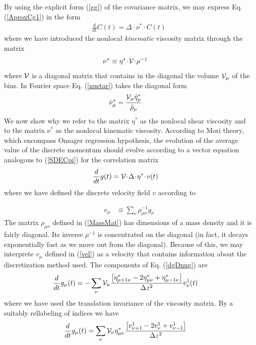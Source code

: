 \documentclass[b5paper,openright,11pt]{book}
\newcommand{\esc}{\!\cdot\!}
\begin{document}
By using the explicit form (\ref{gg}) of the covariance matrix, we may
express Eq. (\ref{AproxCg1}) in the form
\begin{align}
\frac{d}{dt}C(t)= \Delta\esc \nu^*\esc C(t)
\label{SDECpi}
\end{align}
where we  have introduced  the nonlocal  \textit{kinematic} viscosity
matrix through the matrix
\begin{align}
\nu^*&\equiv  \eta^*\esc{\cal V}\esc \rho^{-1}
\label{nustar}
\end{align}
where ${\cal  V}$ is a diagonal  matrix that contains in  the diagonal
the volume ${\cal  V}_\mu$ of the bins.   In Fourier space Eq. (\ref{nustar})
takes the diagonal form
\begin{align}
  \tilde{\nu}_\mu^*&=  \frac{{\cal V}_\mu \tilde{\eta}_\mu^*}{\tilde{\rho}_\mu}
\end{align}
We now show why we refer to the matrix $\eta^*$ as the nonlocal shear
viscosity  and  to  the  matrix $\nu^*$  as  the  nonlocal  kinematic
viscosity.   According   to  Mori  theory,  which   encompass  Onsager
regression  hypothesis, the  evolution  of the  average  value of  the
discrete momentum should evolve according to a vector equation analogous to
(\ref{SDECpi}) for the correlation matrix
\begin{align}
  \frac{d}{dt}g(t)&={\cal V}\esc \Delta\esc\eta^*\esc v(t)
\label{dgDnug}
\end{align}
where we have defined the discrete velocity field $v$ according to

\begin{align}
  v_\mu&\equiv\sum_\nu \rho_{\mu\nu}^{-1}g_\nu
\label{vel}
\end{align}
The matrix  $\rho_{\mu\nu}$ defined in (\ref{MassMat})  has dimensions
of a mass density and it  is fairly diagonal.  Its inverse $\rho^{-1}$
is concentrated on the diagonal (in fact, it decays exponentially fast
as we move out from the diagonal).  Because of this, we may interprete
$v_\mu$ defined in (\ref{vel}) as a velocity that contains information
about   the   discretization   method   used.    The components of
Eq. (\ref{dgDnug}) are
\begin{align}
  \frac{d}{dt}{g}_\mu(t)&=
-\sum_\nu{\cal V}_\nu 
\frac{\left[
\eta^*_{\mu+1\nu}-2\eta^*_{\mu\nu}+\eta^*_{\mu-1\nu}\right]}{\Delta z^2}{v}_\nu^1(t)
\end{align}
where we have used the translation invariance of the viscosity matrix.
By a suitably rellabeling  of indices we have
\begin{align}
  \frac{d}{dt}{g}_\mu(t)&=\sum_\nu{\cal V}_\nu \eta^*_{\mu\nu}
\frac{\left[{v}_{\nu+1}^1-2{v}_{\nu}^1+{v}_{\nu-1}^1\right]}{\Delta z^2}
\label{SDELap0} 
\end{align}
\end{document}

